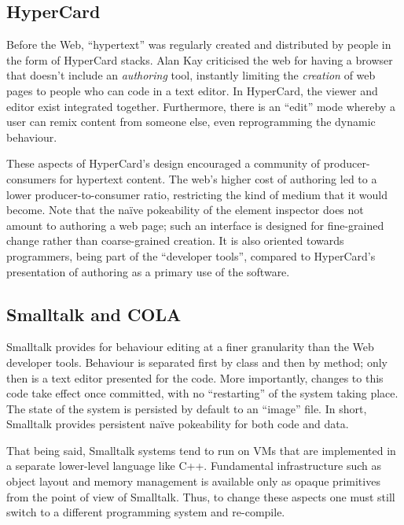 \hypertarget{hypercard}{%
\subsection{HyperCard}\label{hypercard}}

Before the Web, ``hypertext'' was regularly created and distributed by
people in the form of HyperCard stacks. Alan Kay criticised the web for
having a browser that doesn't include an \emph{authoring} tool,
instantly limiting the \emph{creation} of web pages to people who can
code in a text editor. In HyperCard, the viewer and editor exist
integrated together. Furthermore, there is an ``edit'' mode whereby a
user can remix content from someone else, even reprogramming the dynamic
behaviour.

These aspects of HyperCard's design encouraged a community of
producer-consumers for hypertext content. The web's higher cost of
authoring led to a lower producer-to-consumer ratio, restricting the
kind of medium that it would become. Note that the naïve pokeability of
the element inspector does not amount to authoring a web page; such an
interface is designed for fine-grained change rather than coarse-grained
creation. It is also oriented towards programmers, being part of the
``developer tools'', compared to HyperCard's presentation of authoring
as a primary use of the software.

\hypertarget{smalltalk-and-cola}{%
\subsection{Smalltalk and COLA}\label{smalltalk-and-cola}}

Smalltalk provides for behaviour editing at a finer granularity than the
Web developer tools. Behaviour is separated first by class and then by
method; only then is a text editor presented for the code. More
importantly, changes to this code take effect once committed, with no
``restarting'' of the system taking place. The state of the system is
persisted by default to an ``image'' file. In short, Smalltalk provides
persistent naïve pokeability for both code and data.

That being said, Smalltalk systems tend to run on VMs that are
implemented in a separate lower-level language like C++. Fundamental
infrastructure such as object layout and memory management is available
only as opaque primitives from the point of view of Smalltalk. Thus, to
change these aspects one must still switch to a different programming
system and re-compile.


